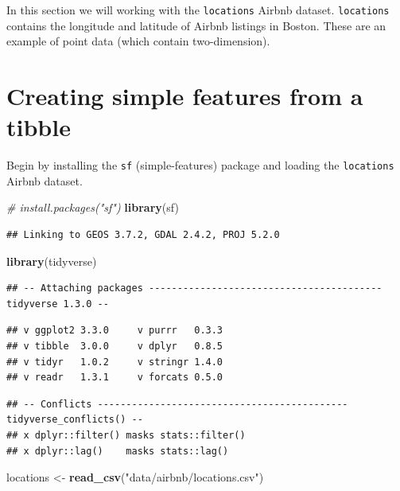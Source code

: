 \documentclass[
]{book}
\newenvironment{Shaded}{\begin{snugshade}}{\end{snugshade}}
\newcommand{\CommentTok}[1]{\textcolor[rgb]{0.56,0.35,0.01}{\textit{#1}}}
\newcommand{\KeywordTok}[1]{\textcolor[rgb]{0.13,0.29,0.53}{\textbf{#1}}}
\newcommand{\NormalTok}[1]{#1}
\newcommand{\StringTok}[1]{\textcolor[rgb]{0.31,0.60,0.02}{#1}}
\begin{document}
In this section we will working with the \texttt{locations} Airbnb dataset. \texttt{locations} contains the longitude and latitude of Airbnb listings in Boston. These are an example of point data (which contain two-dimension).

\hypertarget{creating-simple-features-from-a-tibble}{%
\section{Creating simple features from a tibble}\label{creating-simple-features-from-a-tibble}}

Begin by installing the \texttt{sf} (simple-features) package and loading the \texttt{locations} Airbnb dataset.

\begin{Shaded}
\begin{Highlighting}[]
\CommentTok{\# install.packages("sf")}
\KeywordTok{library}\NormalTok{(sf)}
\end{Highlighting}
\end{Shaded}

\begin{verbatim}
## Linking to GEOS 3.7.2, GDAL 2.4.2, PROJ 5.2.0
\end{verbatim}

\begin{Shaded}
\begin{Highlighting}[]
\KeywordTok{library}\NormalTok{(tidyverse)}
\end{Highlighting}
\end{Shaded}

\begin{verbatim}
## -- Attaching packages ----------------------------------------- tidyverse 1.3.0 --
\end{verbatim}

\begin{verbatim}
## v ggplot2 3.3.0     v purrr   0.3.3
## v tibble  3.0.0     v dplyr   0.8.5
## v tidyr   1.0.2     v stringr 1.4.0
## v readr   1.3.1     v forcats 0.5.0
\end{verbatim}

\begin{verbatim}
## -- Conflicts -------------------------------------------- tidyverse_conflicts() --
## x dplyr::filter() masks stats::filter()
## x dplyr::lag()    masks stats::lag()
\end{verbatim}

\begin{Shaded}
\begin{Highlighting}[]
\NormalTok{locations \textless{}{-}}\StringTok{ }\KeywordTok{read\_csv}\NormalTok{(}\StringTok{"data/airbnb/locations.csv"}\NormalTok{)}
\end{Highlighting}
\end{Shaded}
\end{document}
